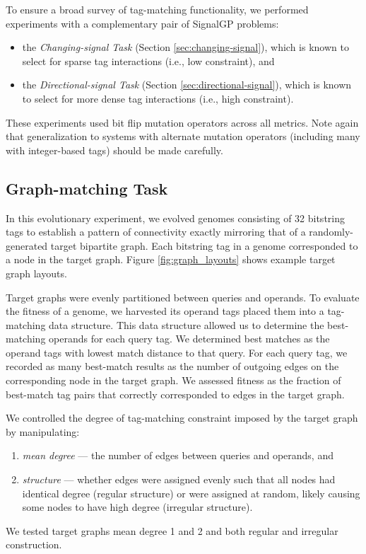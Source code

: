 To ensure a broad survey of tag-matching functionality, we performed experiments with a complementary pair of SignalGP problems:
\begin{itemize}
    \item the \textit{Changing-signal Task} (Section \ref{sec:changing-signal}), which is known to select for sparse tag interactions (i.e., low constraint), and
    \item the \textit{Directional-signal Task} (Section \ref{sec:directional-signal}), which is known to select for more dense tag interactions (i.e., high constraint).
\end{itemize}

These experiments used bit flip mutation operators across all metrics.
Note again that generalization to systems with alternate mutation operators (including many with integer-based tags) should be made carefully.

\subsection{Graph-matching Task} \label{sec:graph-matching}




In this evolutionary experiment, we evolved genomes consisting of 32 bitstring tags to establish a pattern of connectivity exactly mirroring that of a randomly-generated target bipartite graph.
Each bitstring tag in a genome corresponded to a node in the target graph.
Figure \ref{fig:graph_layouts} shows example target graph layouts.

Target graphs were evenly partitioned between queries and operands.
To evaluate the fitness of a genome, we harvested its operand tags placed them into a tag-matching data structure.
This data structure allowed us to determine the best-matching operands for each query tag.
We determined best matches as the operand tags with lowest match distance to that query.
For each query tag, we recorded as many best-match results as the number of outgoing edges on the corresponding node in the target graph.
We assessed fitness as the fraction of best-match tag pairs that correctly corresponded to edges in the target graph.

We controlled the degree of tag-matching constraint imposed by the target graph by manipulating:
\begin{enumerate}
  \item \textit{mean degree} --- the number of edges between queries and operands, and
  \item \textit{structure} --- whether edges were assigned evenly such that all nodes had identical degree (regular structure) or were assigned at random, likely causing some nodes to have high degree (irregular structure).
\end{enumerate}
We tested target graphs mean degree 1 and 2 and both regular and irregular construction.


